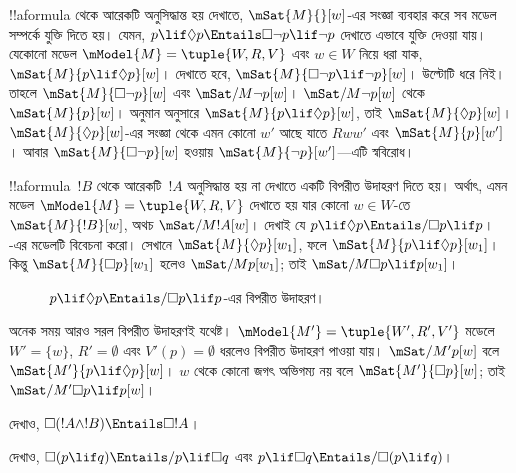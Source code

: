 \documentclass[../../../include/open-logic-section]{subfiles}
\begin{document}
\begin{ex}
  !!a{formula} থেকে আরেকটি অনুসিদ্ধান্ত হয় দেখাতে,
  $\mSat{M}{}[w]$-এর সংজ্ঞা ব্যবহার করে সব মডেল সম্পর্কে যুক্তি দিতে
  হয়। যেমন, $p \lif \Diamond p \Entails \Box\lnot p \lif \lnot p$
  দেখাতে এভাবে যুক্তি দেওয়া যায়। যেকোনো মডেল
  $\mModel{M} = \tuple{W, R, V}$ এবং $w \in W$ নিয়ে ধরা যাক,
  $\mSat{M}{p \lif \Diamond p}[w]$। দেখাতে হবে,
  $\mSat{M}{\Box\lnot p \lif \lnot p}[w]$। উল্টোটি ধরে নিই।
  তাহলে $\mSat{M}{\Box\lnot p}[w]$ এবং
  $\mSat/{M}{\lnot p}[w]$। $\mSat/{M}{\lnot p}[w]$ থেকে
  $\mSat{M}{p}[w]$। অনুমান অনুসারে
  $\mSat{M}{p \lif \Diamond p}[w]$, তাই
  $\mSat{M}{\Diamond p}[w]$। $\mSat{M}{\Diamond p}[w]$-এর
  সংজ্ঞা থেকে এমন কোনো $w'$ আছে যাতে $Rww'$ এবং
  $\mSat{M}{p}[w']$। আবার $\mSat{M}{\Box \lnot p}[w]$
  হওয়ায় $\mSat{M}{\lnot p}[w']$—এটি স্ববিরোধ।

  !!a{formula}~$!B$ থেকে আরেকটি~$!A$ অনুসিদ্ধান্ত হয় না দেখাতে
  একটি বিপরীত উদাহরণ দিতে হয়। অর্থাৎ, এমন মডেল
  $\mModel{M} = \tuple{W, R, V}$ দেখাতে হয় যার কোনো $w \in W$-তে
  $\mSat{M}{!B}[w]$, অথচ $\mSat/{M}{!A}[w]$। দেখাই যে
  $p \lif \Diamond p \Entails/ \Box p \lif p$।
  -এর মডেলটি বিবেচনা করো। সেখানে
  $\mSat{M}{\Diamond p}[w_1]$, ফলে
  $\mSat{M}{p \lif \Diamond p}[w_1]$। কিন্তু
  $\mSat{M}{\Box p}[w_1]$ হলেও $\mSat/{M}{p}[w_1]$;
  তাই $\mSat/{M}{\Box p \lif p}[w_1]$।
  \begin{figure}
  \begin{center}
  \end{center}
  \caption{$p \lif \Diamond p
  \Entails/ \Box p \lif p$-এর বিপরীত উদাহরণ।} %
  \end{figure}

  অনেক সময় আরও সরল বিপরীত উদাহরণই যথেষ্ট।
  $\mModel{M'} = \tuple{W', R', V'}$ মডেলে %
  $W' = \{w\}$, $R' = \emptyset$ এবং $V'(p) = \emptyset$ ধরলেও
  বিপরীত উদাহরণ পাওয়া যায়। $\mSat/{M'}{p}[w]$ বলে
  $\mSat{M'}{p \lif \Diamond p}[w]$। $w$ থেকে কোনো জগৎ
  অভিগম্য নয় বলে $\mSat{M'}{\Box p}[w]$; তাই
  $\mSat/{M'}{\Box p \lif p}[w]$।
\end{ex}

\begin{prob}
  দেখাও, $\Box (!A \land !B) \Entails \Box !A$।
\end{prob}

\begin{prob}
  দেখাও, $\Box (p \lif q) \Entails/ p \lif \Box q$ এবং
  $p \lif \Box q \Entails/\Box (p \lif q)$।
\end{prob}
\end{document}
